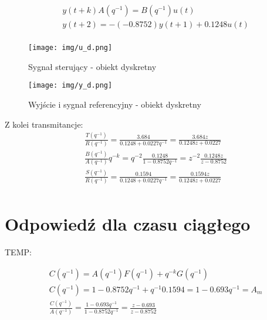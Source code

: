 \documentclass[fleqn]{article}
\newcommand \A {1 - 0.8752 q^{-1}}
\newcommand \B {0.1248}
\newcommand \Am {1 - 0.693 q^{-1}}
\newcommand \Bm {3.684}
\newcommand \aOne {-0.8752}
\newcommand \amOne {-0.693}
\newcommand \G {0.1594}
\newcommand \R {\B + 0.0227 q^{-1}}
\newcommand \T {\Bm}
\begin{document}
\begin{equation}\label{eq:output}
\begin{split}
& y(t+k) A(q^{-1}) = B(q^{-1}) u(t) \\
& y(t+2) = -(\aOne) y(t+1) + \B u(t) \\
\end{split}
\end{equation}

\begin{figure}[H]
    \centering
    \texttt{[image: img/u\_d.png]}
    \caption{Sygnał sterujący - obiekt dyskretny}
    \label{fig:u_d}
\end{figure}

\begin{figure}[H]
    \centering
    \texttt{[image: img/y\_d.png]}
    \caption{Wyjście i sygnał referencyjny - obiekt dyskretny}
    \label{fig:y_d}
\end{figure}

Z kolei transmitancje:
\begin{equation}\label{eq:transmitances}
\begin{split}
& \frac{T(q^{-1})}{R(q^{-1})} = \frac{\T}{\R} = \frac{3.684 z}{0.1248z + 0.0227}\\
& \frac{B(q^{-1})}{A(q^{-1})} q^{-k} = q^{-2}\frac{\B}{\A} = z^{-2} \frac{0.1248 z}{z - 0.8752}\\
& \frac{S(q^{-1})}{R(q^{-1})} = \frac{\G}{\R} = \frac{0.1594 z}{0.1248z + 0.0227}\\
\end{split}
\end{equation}


\section{Odpowiedź dla czasu ciągłego}
TEMP:

\begin{equation}\label{eq:C}
\begin{split}
& C(q^{-1}) = A(q^{-1})F(q^{-1}) + q^{-k}G(q^{-1})  \\
& C(q^{-1}) = \A + q^{-1} \G = 1 - 0.693 q^{-1} = A_m  \\
& \frac{C(q^{-1})}{A(q^{-1})} = \frac{\Am}{\A}  = \frac{z \amOne}{z \aOne}\\
\end{split}
\end{equation}
\end{document}
